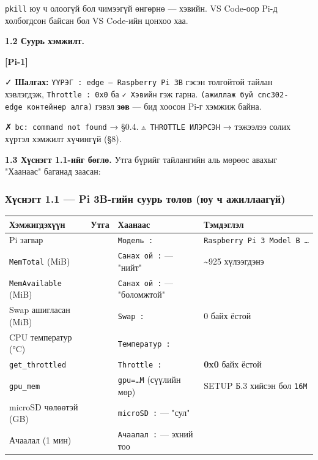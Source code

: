 \texttt{pkill} юу ч олоогүй бол чимээгүй өнгөрнө --- хэвийн. VS Code-оор Pi-д холбогдсон байсан бол VS Code-ийн цонхоо хаа.

\textbf{1.2 Суурь хэмжилт.}

\textbf{{[}Pi-1{]}}

\begin{Shaded}
\begin{Highlighting}[]
\KeywordTok{|} 
\KeywordTok{|} 
\end{Highlighting}
\end{Shaded}

✓ \textbf{Шалгах:} \texttt{ҮҮРЭГ\ :\allowbreak{}\ edge\ —\ Raspberry\ Pi\ 3B} гэсэн толгойтой тайлан хэвлэгдэж, \texttt{Throttle\ :\ 0x0} ба \texttt{✓\ Хэвийн} гэж гарна. \texttt{(ажиллаж\ буй\ cnc302-edge\ контейнер\ алга)} гэвэл \textbf{зөв} --- бид хоосон Pi-г хэмжиж байна.

✗ \texttt{bc:\allowbreak{}\ command\ not\ found} → §0.4. \texttt{⚠\ THROTTLE\ ИЛЭРСЭН} → тэжээлээ солих хүртэл хэмжилт хүчингүй (§8).

\textbf{1.3 Хүснэгт 1.1-ийг бөглө.} Утга бүрийг тайлангийн аль мөрөөс авахыг "Хаанаас" баганад заасан:

\hypertarget{ux445ux4afux441ux43dux44dux433ux442-1.1-pi-3b-ux433ux438ux439ux43d-ux441ux443ux443ux440ux44c-ux442ux4e9ux43bux4e9ux432-ux44eux443-ux447-ux430ux436ux438ux43bux43bux430ux430ux433ux4afux439}{%
\subsubsection{Хүснэгт 1.1 --- Pi 3B-гийн суурь төлөв (юу ч ажиллаагүй)}\label{ux445ux4afux441ux43dux44dux433ux442-1.1-pi-3b-ux433ux438ux439ux43d-ux441ux443ux443ux440ux44c-ux442ux4e9ux43bux4e9ux432-ux44eux443-ux447-ux430ux436ux438ux43bux43bux430ux430ux433ux4afux439}}

\begingroup\scriptsize\begin{longtable}[]{@{}llll@{}}
\toprule
Хэмжигдэхүүн & Утга & Хаанаас & Тэмдэглэл\tabularnewline
\midrule
\endhead
Pi загвар & & \texttt{Модель\ :} & \texttt{Raspberry\ Pi\ 3\ Model\ B\ \ldots{}}\tabularnewline
\texttt{MemTotal} (MiB) & & \texttt{Санах\ ой\ :} --- "нийт" & \textasciitilde925 хүлээгдэнэ\tabularnewline
\texttt{MemAvailable} (MiB) & & \texttt{Санах\ ой\ :} --- "боломжтой" &\tabularnewline
Swap ашигласан (MiB) & & \texttt{Swap\ :} & 0 байх ёстой\tabularnewline
CPU температур (°C) & & \texttt{Температур\ :} &\tabularnewline
\texttt{get\_throttled} & & \texttt{Throttle\ :} & \textbf{0x0} байх ёстой\tabularnewline
\texttt{gpu\_mem} & & \texttt{gpu=\ldots{}M} (сүүлийн мөр) & SETUP Б.3 хийсэн бол \texttt{16M}\tabularnewline
microSD чөлөөтэй (GB) & & \texttt{microSD\ :} --- "сул" &\tabularnewline
Ачаалал (1 мин) & & \texttt{Ачаалал\ :} --- эхний тоо &\tabularnewline
\bottomrule
\end{longtable}\endgroup

